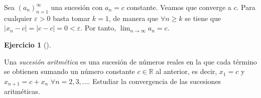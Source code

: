 \documentclass[
  spanish,
  a4paper,
]{scrreport}
\theoremstyle{definition}
\newtheorem{exercise}{Ejercicio}[chapter]
\theoremstyle{remark}
\begin{document}
\begin{tcolorbox}[enhanced jigsaw, arc=.35mm, bottomrule=.15mm, bottomtitle=1mm, breakable, colback=white, colbacktitle=quarto-callout-tip-color!10!white, colframe=quarto-callout-tip-color-frame, coltitle=black, left=2mm, leftrule=.75mm, opacityback=0, opacitybacktitle=0.6, rightrule=.15mm, title=\textcolor{quarto-callout-tip-color}{\faLightbulb}\hspace{0.5em}{Solución}, titlerule=0mm, toprule=.15mm, toptitle=1mm]

Sea \((a_n)_{n=1}^\infty\) una sucesión con \(a_n = c\) constante.
Veamos que converge a \(c\). Para cualquier \(\varepsilon>0\) basta
tomar \(k=1\), de manera que \(\forall n\geq k\) se tiene que
\(|x_n-c|=|c-c| = 0 <\varepsilon\). Por tanto,
\(\lim_{n\to\infty}a_n =c\).

\end{tcolorbox}

\begin{exercise}[]\protect\hypertarget{exr-sucesion-aritmética}{}\label{exr-sucesion-aritmética}

Una \emph{sucesión aritmética} es una sucesión de números reales en la
que cada término se obtienen sumando un número constante
\(c\in\mathbb{R}\) al anterior, es decir, \(x_1=c\) y
\(x_{n+1} = c+x_n\) \(\forall n=2,3,\ldots\). Estudiar la convergencia
de las sucesiones aritméticas.

\end{exercise}
\end{document}
